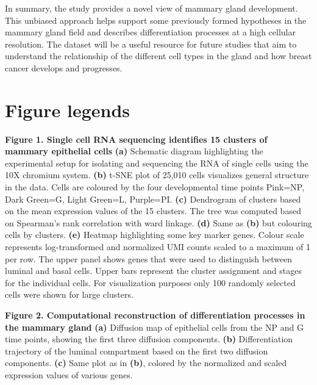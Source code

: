 \documentclass[titlepage, 12pt, oneside]{amsart}
\newcommand{\fakefigure}[1]%
{\refstepcounter{figure}\label{#1}}
\begin{document}
In summary, the study provides a novel view of mammary gland development.
This unbiased approach helps support some previously formed hypotheses in the mammary gland field and describes differentiation processes at a high cellular resolution.
The dataset will be a useful resource for future studies that aim to understand the relationship of the different cell types in the gland and how breast cancer develops and progresses.

\section{Figure legends}

\textbf{Figure 1. Single cell RNA sequencing identifies 15 clusters of mammary epithelial cells }
\fakefigure{F1}
\textbf{(a)} Schematic diagram highlighting the experimental setup for isolating and sequencing the RNA of single cells using the 10X chromium system.
\textbf{(b)} t-SNE plot of 25,010 cells visualizes general structure in the data.
Cells are coloured by the four developmental time points Pink=NP, Dark Green=G, Light Green=L, Purple=PI.
\textbf{(c)} Dendrogram of clusters based on the mean expression values of the 15 clusters. The tree was computed based on Spearman's rank correlation with ward linkage.
\textbf{(d)} Same as \textbf{(b)} but colouring cells by clusters.
\textbf{(e)} Heatmap highlighting some key marker genes.
Colour scale represents log-transformed and normalized UMI counts scaled to a maximum of 1 per row.
The upper panel shows genes that were used to distinguish between luminal and basal cells.
Upper bars represent the cluster assignment and stages for the individual cells.
For visualization purposes only 100 randomly selected cells were shown for large clusters.


\textbf{Figure 2. Computational reconstruction of differentiation processes in the mammary gland}
\fakefigure{F2}
\textbf{(a)} Diffusion map of epithelial cells from the NP and G time points, showing the first three diffusion components.
\textbf{(b)} Differentiation trajectory of the luminal compartment based on the first two diffusion components.
\textbf{(c)} Same plot as in \textbf{(b)}, colored by the normalized and scaled expression values of various genes.
\end{document}
